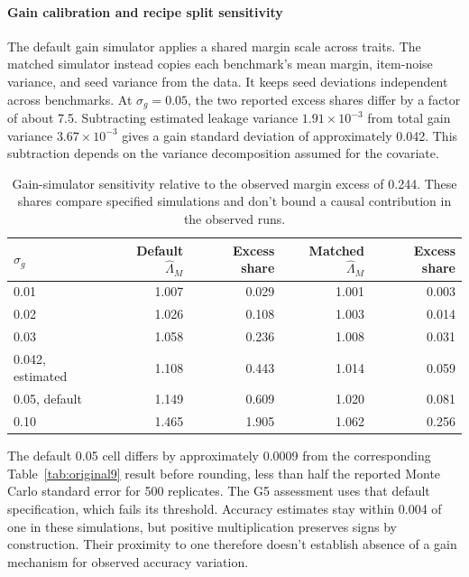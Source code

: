 \paragraph{Gain calibration and recipe split sensitivity}
The default gain simulator applies a shared margin scale across traits. The matched simulator instead copies each benchmark's mean margin, item-noise variance, and seed variance from the data. It keeps seed deviations independent across benchmarks. At $\sigma_g=0.05$, the two reported excess shares differ by a factor of about 7.5. Subtracting estimated leakage variance $1.91\times10^{-3}$ from total gain variance $3.67\times10^{-3}$ gives a gain standard deviation of approximately 0.042. This subtraction depends on the variance decomposition assumed for the covariate.

\begin{table}[!htb]
\centering
\caption{Gain-simulator sensitivity relative to the observed margin excess of 0.244. These shares compare specified simulations and don't bound a causal contribution in the observed runs.}
\label{tab:original13}
\small\setlength{\tabcolsep}{4pt}\renewcommand{\arraystretch}{1.12}
\begin{tabular}{lrrrr}\toprule
$\sigma_g$ & Default $\widehat\Lambda_M$ & Excess share & Matched $\widehat\Lambda_M$ & Excess share\\\midrule
0.01 & 1.007 & 0.029 & 1.001 & 0.003\\
0.02 & 1.026 & 0.108 & 1.003 & 0.014\\
0.03 & 1.058 & 0.236 & 1.008 & 0.031\\
0.042, estimated & 1.108 & 0.443 & 1.014 & 0.059\\
0.05, default & 1.149 & 0.609 & 1.020 & 0.081\\
0.10 & 1.465 & 1.905 & 1.062 & 0.256\\\bottomrule
\end{tabular}
\end{table}

The default 0.05 cell differs by approximately 0.0009 from the corresponding Table~\ref{tab:original9} result before rounding, less than half the reported Monte Carlo standard error for 500 replicates. The G5 assessment uses that default specification, which fails its threshold. Accuracy estimates stay within 0.004 of one in these simulations, but positive multiplication preserves signs by construction. Their proximity to one therefore doesn't establish absence of a gain mechanism for observed accuracy variation.


